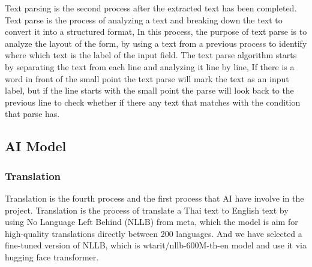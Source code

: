 \documentclass[12pt,oneside,openright,a4paper]{cpe-english-project}
\begin{document}
Text parsing is the second process after the extracted text has been completed. Text parse is the process of analyzing a text and breaking down the text to convert it into a structured format, In this process, the purpose of text parse is to analyze the layout of the form, by using a text from a previous process to identify where which text is the label of the input field. The text parse algorithm starts by separating the text from each line and analyzing it line by line, If there is a word in front of the small point the text parse will mark the text as an input label, but if the line starts with the small point the parse will look back to the previous line to check whether if there any text that matches with the condition that parse has.



\subsection{AI Model}

\subsubsection{Translation}

Translation is the fourth process and the first process that AI have involve in the project. Translation is the process of  translate a Thai text to English text by using No Language Left Behind (NLLB) from meta, which the model is aim for high-quality translations directly between 200 languages. And we have selected a fine-tuned version of NLLB, which is wtarit/nllb-600M-th-en model and use it via hugging face transformer.
\end{document}
